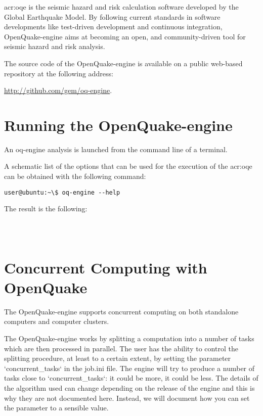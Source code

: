 \gls{acr:oqe} is the seismic hazard and risk calculation software developed by
the Global Earthquake Model. By following current standards in software
developments like test-driven development and continuous integration,
OpenQuake-engine aims at becoming an open, and community-driven tool for
seismic hazard and risk analysis.

The source code of the OpenQuake-engine is available on a public web-based
repository at the following address:

\href{http://github.com/gem/oq-engine}{http://github.com/gem/oq-engine}.


\section{Running the OpenQuake-engine}
\label{sec:running_oq_engine}

An oq-engine analysis is launched from the command line of a terminal.

A schematic list of the options that can be used for the execution of the
\gls{acr:oqe} can be obtained with the following command:

\begin{verbatim}
user@ubuntu:~\$ oq-engine --help
\end{verbatim}

The result is the following:

\inputminted[firstline=1,fontsize=\footnotesize,frame=single]{shell-session}{oqum/help.txt}\\

\section{Concurrent Computing with OpenQuake}
\label{sec:concurrent_tasks}

The OpenQuake-engine supports concurrent computing on both standalone
computers and computer clusters.

The OpenQuake-engine works by splitting a computation into a number of tasks
which are then processed in parallel. The user has the ability to control the
splitting procedure, at least to a certain extent, by setting the parameter
`concurrent\_tasks` in the job.ini file. The engine will try to produce a
number of tasks close to `concurrent\_tasks`: it could be more, it could be
less. The details of the algorithm used can change depending on the release of
the engine and this is why they are not documented here. Instead, we will
document how you can set the parameter to a sensible value.

